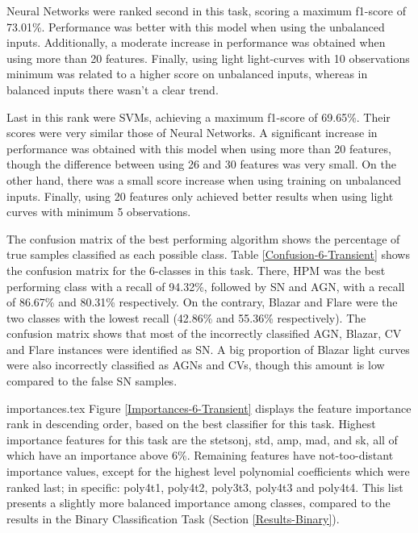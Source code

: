 \documentclass[a4paper,fleqn,usenatbib]{mnras}
\begin{document}
Neural Networks were ranked second in this task, scoring a maximum f1-score of 73.01\%. Performance was better with this model when using the unbalanced inputs. Additionally, a moderate increase in performance was obtained when using more than 20 features. Finally, using light light-curves with 10 observations minimum was related to a higher score on unbalanced inputs, whereas in balanced inputs there wasn't a clear trend.

Last in this rank were SVMs, achieving a maximum f1-score of 69.65\%. Their scores were very similar those of Neural Networks. A significant increase in performance was obtained with this model when using more than 20 features, though the difference between using 26 and 30 features was very small. On the other hand, there was a small score increase when using training on unbalanced inputs. Finally, using 20 features only achieved better results when using light curves with minimum 5 observations.

The confusion matrix of the best performing algorithm shows the percentage of true samples classified as each possible class. 
Table \ref{Confusion-6-Transient} shows the confusion matrix for the 6-classes in this task. There, HPM was the best performing class with a recall of 94.32\%, followed by SN and AGN, with a recall of 86.67\% and 80.31\% respectively. On the contrary, Blazar and Flare were the two classes with the lowest recall (42.86\% and 55.36\% respectively). The confusion matrix shows that most of the incorrectly classified AGN, Blazar, CV and Flare instances were identified as SN. A big proportion of Blazar light curves were also incorrectly classified as AGNs and CVs, though this amount is low compared to the false SN samples.


{importances.tex}
Figure \ref{Importances-6-Transient} displays the feature importance rank in descending order, based on the best classifier for this task. 
Highest importance features for this task are the
stetson\textunderscore j, std, amp, mad, and sk, all of which have an importance above 6\%. 
Remaining features have not-too-distant importance values, except for the highest level polynomial coefficients which were ranked last; in specific: 
poly4\textunderscore t1, poly4\textunderscore t2, poly3\textunderscore t3, poly4\textunderscore t3 and poly4\textunderscore t4. 
This list presents a slightly more balanced importance among classes, compared to the results in the Binary Classification Task (Section \ref{Results-Binary}).
\end{document}
